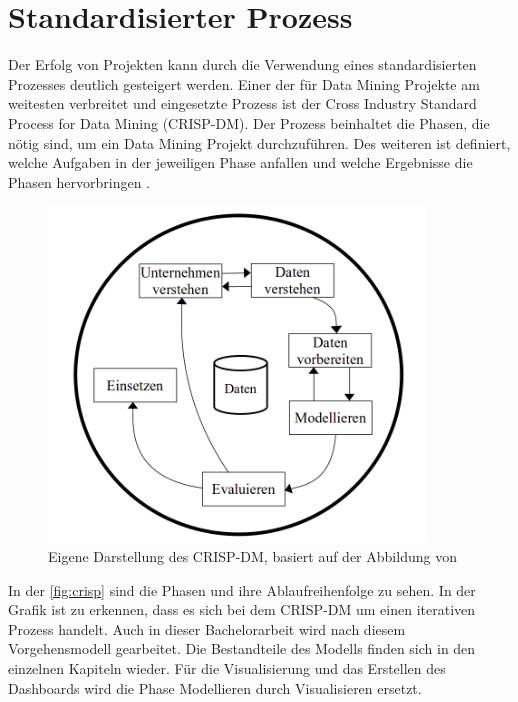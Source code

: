 \section{Standardisierter Prozess}
Der Erfolg von Projekten kann durch die Verwendung eines standardisierten Prozesses deutlich gesteigert werden.
Einer der für Data Mining Projekte am weitesten verbreitet und eingesetzte Prozess ist der Cross Industry Standard Process for Data Mining (CRISP-DM). \cite{d.kelleher2015crispdm}
Der Prozess beinhaltet die Phasen, die nötig sind, um ein Data Mining Projekt durchzuführen. 
Des weiteren ist definiert, welche Aufgaben in der jeweiligen Phase anfallen und welche Ergebnisse die Phasen hervorbringen \cite{wirth2000}.

\begin{figure}[h]
\centering
\includegraphics[width=100mm,scale=1]{content/CRISP-Prozess.png}
\caption{Eigene Darstellung des CRISP-DM, basiert auf der Abbildung von \cite{wirth2000}}\label{fig:crisp}
\end{figure}
In der \autoref{fig:crisp} sind die Phasen und ihre Ablaufreihenfolge zu sehen. 
In der Grafik ist zu erkennen, dass es sich bei dem CRISP-DM um einen iterativen Prozess handelt.
Auch in dieser Bachelorarbeit wird nach diesem Vorgehensmodell gearbeitet. 
Die Bestandteile des Modells finden sich in den einzelnen Kapiteln wieder. 
Für die Visualisierung und das Erstellen des Dashboards wird die Phase Modellieren durch Visualisieren ersetzt. 
\\

